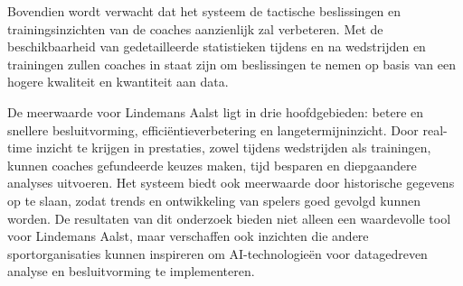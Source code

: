 Bovendien wordt verwacht dat het systeem de tactische beslissingen en trainingsinzichten van de coaches aanzienlijk zal verbeteren. Met de beschikbaarheid van gedetailleerde statistieken tijdens en na wedstrijden en trainingen zullen coaches in staat zijn om beslissingen te nemen op basis van een hogere kwaliteit en kwantiteit aan data. 

De meerwaarde voor Lindemans Aalst ligt in drie hoofdgebieden: betere en snellere besluitvorming, efficiëntieverbetering en langetermijninzicht. Door real-time inzicht te krijgen in prestaties, zowel tijdens wedstrijden als trainingen, kunnen coaches gefundeerde keuzes maken, tijd besparen en diepgaandere analyses uitvoeren. Het systeem biedt ook meerwaarde door historische gegevens op te slaan, zodat trends en ontwikkeling van spelers goed gevolgd kunnen worden. De resultaten van dit onderzoek bieden niet alleen een waardevolle tool voor Lindemans Aalst, maar verschaffen ook inzichten die andere sportorganisaties kunnen inspireren om AI-technologieën voor datagedreven analyse en besluitvorming te implementeren.
